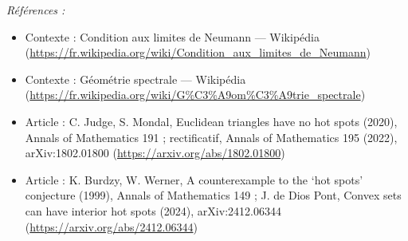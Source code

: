 \documentclass[11pt]{article}
\newenvironment{refs}{\par\small\noindent\emph{Références :}\begin{itemize}\setlength\itemsep{0pt}}{\end{itemize}\normalsize}
\begin{document}
\begin{refs}
\item Contexte : Condition aux limites de Neumann --- Wikipédia (\url{https://fr.wikipedia.org/wiki/Condition_aux_limites_de_Neumann})
\item Contexte : Géométrie spectrale --- Wikipédia (\url{https://fr.wikipedia.org/wiki/G%C3%A9om%C3%A9trie_spectrale})
\item Article : C. Judge, S. Mondal, \og{} Euclidean triangles have no hot spots \fg{} (2020), Annals of Mathematics 191 ; rectificatif, Annals of Mathematics 195 (2022), arXiv:1802.01800 (\url{https://arxiv.org/abs/1802.01800})
\item Article : K. Burdzy, W. Werner, \og{} A counterexample to the `hot spots' conjecture \fg{} (1999), Annals of Mathematics 149 ; J. de Dios Pont, \og{} Convex sets can have interior hot spots \fg{} (2024), arXiv:2412.06344 (\url{https://arxiv.org/abs/2412.06344})
\end{refs}

\bigskip
\end{document}
